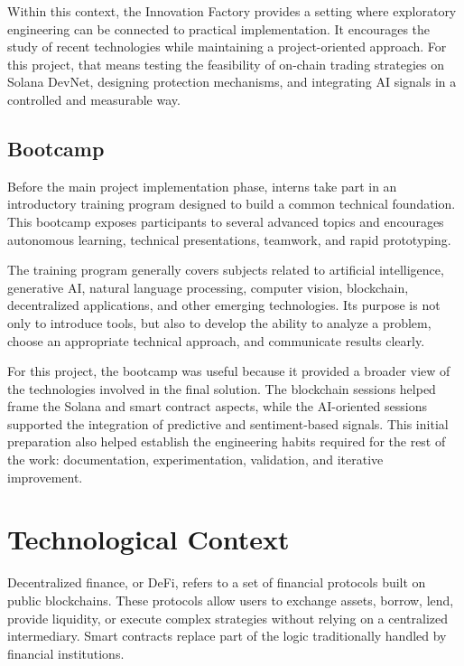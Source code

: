 \documentclass[12pt,a4paper]{report}
\begin{document}
Within this context, the Innovation Factory provides a setting where exploratory engineering can be connected to practical implementation. It encourages the study of recent technologies while maintaining a project-oriented approach. For this project, that means testing the feasibility of on-chain trading strategies on Solana DevNet, designing protection mechanisms, and integrating AI signals in a controlled and measurable way.

\subsection{Bootcamp}

Before the main project implementation phase, interns take part in an introductory training program designed to build a common technical foundation. This bootcamp exposes participants to several advanced topics and encourages autonomous learning, technical presentations, teamwork, and rapid prototyping.

The training program generally covers subjects related to artificial intelligence, generative AI, natural language processing, computer vision, blockchain, decentralized applications, and other emerging technologies. Its purpose is not only to introduce tools, but also to develop the ability to analyze a problem, choose an appropriate technical approach, and communicate results clearly.

For this project, the bootcamp was useful because it provided a broader view of the technologies involved in the final solution. The blockchain sessions helped frame the Solana and smart contract aspects, while the AI-oriented sessions supported the integration of predictive and sentiment-based signals. This initial preparation also helped establish the engineering habits required for the rest of the work: documentation, experimentation, validation, and iterative improvement.

\section{Technological Context}

Decentralized finance, or DeFi, refers to a set of financial protocols built on public blockchains. These protocols allow users to exchange assets, borrow, lend, provide liquidity, or execute complex strategies without relying on a centralized intermediary. Smart contracts replace part of the logic traditionally handled by financial institutions.
\end{document}
